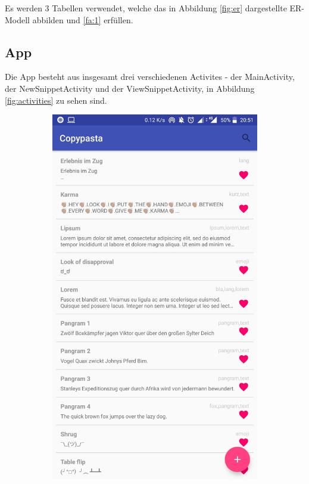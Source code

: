 \documentclass[11pt]{article}
\begin{document}
			\noindent Es werden 3 Tabellen verwendet, welche das in Abbildung \ref{fig:er} dargestellte ER-Modell abbilden und \ref{fa:1} erfüllen.\medskip
			
		
		\subsection{App}
			Die App besteht aus insgesamt drei verschiedenen Activites - der MainActivity, der NewSnippetActivity und der ViewSnippetActivity, in Abbildung \ref{fig:activities} zu sehen sind. 
			
			\begin{figure}
				\centering
				\begin{subfigure}[b]{0.3\textwidth}
					\includegraphics[width=\textwidth]{Konzepte/screenshots/main_list.jpg}

\end{subfigure}
\end{figure}
\end{document}
